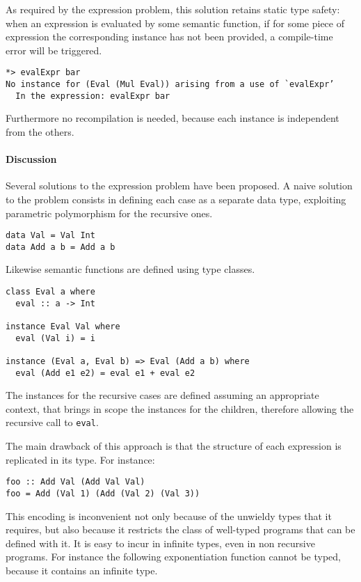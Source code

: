 \documentclass[../Thesis.tex]{subfiles}
\begin{document}
As required by the expression problem, this solution retains static type safety:
when an expression is evaluated by some semantic function,
if for some piece of expression the corresponding instance has
not been provided, a compile-time error will be triggered.

\begin{verbatim}
*> evalExpr bar
No instance for (Eval (Mul Eval)) arising from a use of `evalExpr’
  In the expression: evalExpr bar
\end{verbatim}

Furthermore no recompilation is needed, because each instance is independent from the others.

\paragraph{Discussion}
Several solutions to the expression problem have been proposed.
A naive solution to the problem consists in defining each case as a separate data type, exploiting parametric polymorphism for the recursive ones.

\begin{verbatim}
data Val = Val Int
data Add a b = Add a b
\end{verbatim}

Likewise semantic functions are defined using type classes.

\begin{verbatim}
class Eval a where
  eval :: a -> Int

instance Eval Val where
  eval (Val i) = i

instance (Eval a, Eval b) => Eval (Add a b) where
  eval (Add e1 e2) = eval e1 + eval e2
\end{verbatim}

The instances for the recursive cases are defined assuming an appropriate 
context, that brings in scope the instances for the children, therefore allowing
the recursive call to \texttt{eval}.

The main drawback of this approach is that the structure of each expression is replicated in its type. For instance:

\begin{verbatim}
foo :: Add Val (Add Val Val)
foo = Add (Val 1) (Add (Val 2) (Val 3))
\end{verbatim}

This encoding is inconvenient not only because of the unwieldy types
that it requires, but also because it restricts the class of well-typed programs that can be defined with it. It is easy to incur in infinite types, even in
non recursive programs.
For instance the following exponentiation function cannot be typed, because it contains an infinite type.
\end{document}
